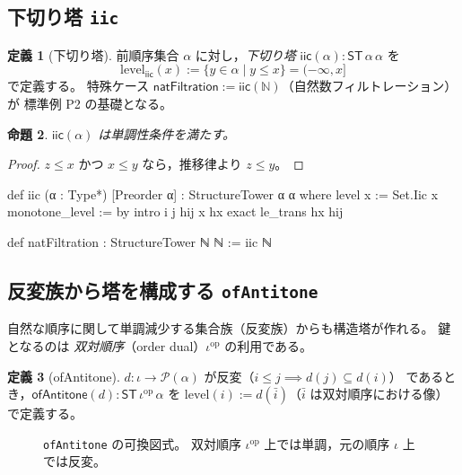 \documentclass[a4paper,11pt]{ltjsarticle}
\theoremstyle{definition}
\newtheorem{definition}{定義}[section]
\theoremstyle{plain}
\newtheorem{proposition}[definition]{命題}
\theoremstyle{remark}
\newcommand{\ST}{\mathsf{ST}}    %
\newcommand{\lev}{\mathrm{level}}
\newcommand{\op}{\mathrm{op}}
\begin{document}
\subsection{下切り塔 \texttt{iic}}

\begin{definition}[下切り塔]\label{def:iic}
前順序集合 $\alpha$ に対し，\emph{下切り塔} $\mathsf{iic}(\alpha) : \ST\,\alpha\,\alpha$ を
\[
  \lev_{\mathsf{iic}}(x) := \{y \in \alpha \mid y \leq x\} = (-\infty, x]
\]
で定義する。
特殊ケース $\mathsf{natFiltration} := \mathsf{iic}(\mathbb{N})$（自然数フィルトレーション）が
標準例 P2 の基礎となる。
\end{definition}

\begin{proposition}
$\mathsf{iic}(\alpha)$ は単調性条件を満たす。
\end{proposition}
\begin{proof}
$z \leq x$ かつ $x \leq y$ なら，推移律より $z \leq y$。
\end{proof}

\begin{leancode}[caption={iic と natFiltration の定義}]
def iic (α : Type*) [Preorder α] : StructureTower α α where
  level x := Set.Iic x
  monotone_level := by
    intro i j hij x hx
    exact le_trans hx hij

def natFiltration : StructureTower ℕ ℕ := iic ℕ
\end{leancode}

\subsection{反変族から塔を構成する \texttt{ofAntitone}}

自然な順序に関して単調減少する集合族（反変族）からも構造塔が作れる。
鍵となるのは \emph{双対順序}（order dual）$\iota^{\op}$ の利用である。

\begin{definition}[ofAntitone]\label{def:ofantitone}
$d : \iota \to \mathcal{P}(\alpha)$ が反変（$i \leq j \implies d(j) \subseteq d(i)$）
であるとき，$\mathsf{ofAntitone}(d) : \ST\,\iota^{\op}\,\alpha$ を
$\lev(i) := d(\bar{i})$（$\bar{i}$ は双対順序における像）で定義する。
\end{definition}

\begin{figure}[H]
\centering
{}
\caption{\texttt{ofAntitone} の可換図式。
  双対順序 $\iota^{\op}$ 上では単調，元の順序 $\iota$ 上では反変。}
\label{fig:ofantitone}
\end{figure}
\end{document}
